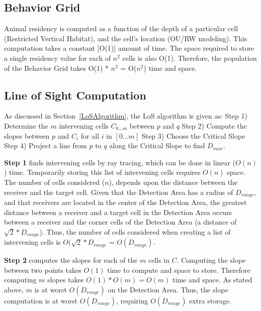 \subsection{Behavior Grid}
Animal residency is computed as a function of the depth of a particular cell (Restricted Vertical Habitat), and the cell's location (OU/RW modeling).  This computation takes a constant [O(1)] amount of time.  The space required to store a single residency value for each of $n^2$ cells is also O(1).  Therefore, the population of the Behavior Grid takes O(1) * $n^2$ = O($n^2$) time and space.


\subsection{Line of Sight Computation}
\label{bigOLoS}
As discussed in Section~\ref{LoSAlgorithm}, the LoS algorithm is given as:\newline
Step 1) Determine the $m$ intervening cells $C_{0...m}$ between $p$ and $q$\newline
Step 2) Compute the slopes between $p$ and $C_i$ for all $i$ in $[0 ... m]$\newline
Step 3) Choose the Critical Slope\newline
Step 4) Project a line from $p$ to $q$ along the Critical Slope to find $D_{max}$.\newline

\noindent\textbf{Step 1} finds intervening cells by ray tracing, which can be done in linear ($O(n)$) time.  Temporarily storing this list of intervening cells requires $O(n)$ space.  The number of cells considered ($n$), depends upon the distance between the receiver and the target cell\cite{rayTracing}.  Given that the Detection Area has a radius of $D_{range}$, and that receivers are located in the center of the Detection Area, the greatest distance between a receiver and a target cell in the Detection Area occurs between a receiver and the corner cells of the Detection Area (a distance of $\sqrt2*D_{range}$).  Thus, the number of cells considered when creating a list of intervening cells is $O(\sqrt2*D_{range}$ = $O(D_{range})$.\newline

\noindent\textbf{Step 2} computes the slopes for each of the $m$ cells in $C$.  Computing the slope between two points takes $O(1)$ time to compute and space to store.  Therefore computing $m$ slopes takes $O(1)*O(m)=O(m)$ time and space.  As stated above, $m$ is at worst $O(D_{range})$ on the Detection Area.  Thus, the slope computation is at worst $O(D_{range})$, requiring $O(D_{range})$ extra storage.\newline

